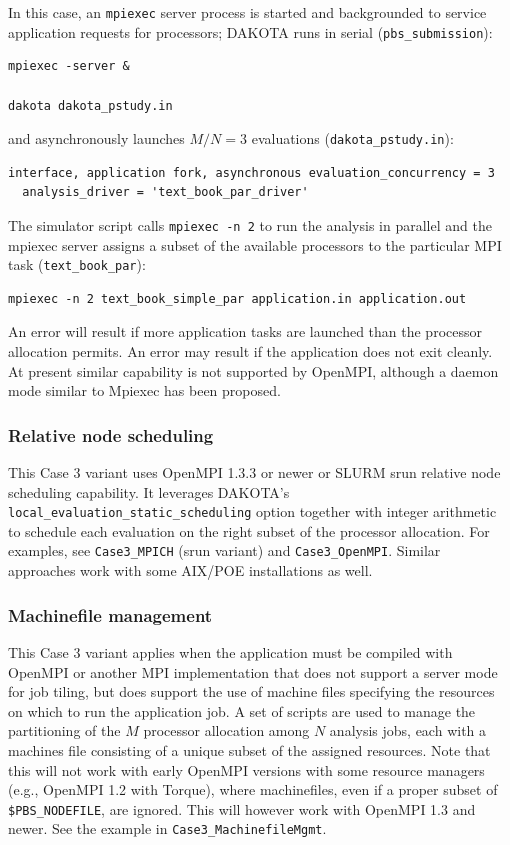 In this case, an {\tt mpiexec} server process is started and
backgrounded to service application requests for processors; DAKOTA
runs in serial ({\tt pbs\_submission}):
\begin{verbatim}
mpiexec -server &

dakota dakota_pstudy.in
\end{verbatim}
and asynchronously launches $M/N=3$ evaluations ({\tt dakota\_pstudy.in}):
\begin{verbatim}
interface, application fork, asynchronous evaluation_concurrency = 3
  analysis_driver = 'text_book_par_driver'
\end{verbatim}
The simulator script calls {\tt mpiexec -n 2} to run the analysis in
parallel and the mpiexec server assigns a subset of the available
processors to the particular MPI task ({\tt text\_book\_par}):
\begin{verbatim}
mpiexec -n 2 text_book_simple_par application.in application.out
\end{verbatim}
An error will result if more application tasks are launched than the
processor allocation permits.  An error may result if the application
does not exit cleanly.  At present similar capability is not supported
by OpenMPI, although a daemon mode similar to Mpiexec has been
proposed.

\subsubsection{Relative node scheduling}

This Case 3 variant uses OpenMPI 1.3.3 or newer or SLURM srun relative
node scheduling capability.  It leverages DAKOTA's
\texttt{local\_evaluation\_static\_scheduling} option together with
integer arithmetic to schedule each evaluation on the right subset of
the processor allocation.  For examples, see \texttt{Case3\_MPICH}
(srun variant) and \texttt{Case3\_OpenMPI}.  Similar approaches work
with some AIX/POE installations as well.

\subsubsection{Machinefile management}

This Case 3 variant applies when the application must be compiled with
OpenMPI or another MPI implementation that does not support a server
mode for job tiling, but does support the use of machine files
specifying the resources on which to run the application job.  A set
of scripts are used to manage the partitioning of the $M$ processor
allocation among $N$ analysis jobs, each with a machines file
consisting of a unique subset of the assigned resources.  Note that
this will not work with early OpenMPI versions with some resource
managers (e.g., OpenMPI 1.2 with Torque), where machinefiles, even if
a proper subset of {\tt \$PBS\_NODEFILE}, are ignored.  This will
however work with OpenMPI 1.3 and newer.  See the example in
\texttt{Case3\_MachinefileMgmt}.

